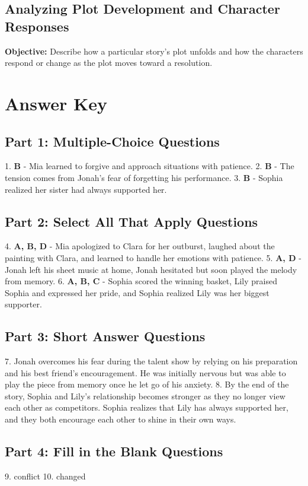 \documentclass[12pt]{article}
\begin{document}
\subsection*{Analyzing Plot Development and Character Responses}
\onehalfspacing

\begin{tcolorbox}[colframe=black!40, colback=gray!0, title=Learning Objective]
\textbf{Objective:} Describe how a particular story’s plot unfolds and how the characters respond or change as the plot moves toward a resolution.
\end{tcolorbox}



\section*{Answer Key}

\subsection*{Part 1: Multiple-Choice Questions}
1. \textbf{B} - Mia learned to forgive and approach situations with patience.  
2. \textbf{B} - The tension comes from Jonah’s fear of forgetting his performance.  
3. \textbf{B} - Sophia realized her sister had always supported her.  

\subsection*{Part 2: Select All That Apply Questions}
4. \textbf{A, B, D} - Mia apologized to Clara for her outburst, laughed about the painting with Clara, and learned to handle her emotions with patience.  
5. \textbf{A, D} - Jonah left his sheet music at home, Jonah hesitated but soon played the melody from memory.  
6. \textbf{A, B, C} - Sophia scored the winning basket, Lily praised Sophia and expressed her pride, and Sophia realized Lily was her biggest supporter.  

\subsection*{Part 3: Short Answer Questions}
7. Jonah overcomes his fear during the talent show by relying on his preparation and his best friend’s encouragement. He was initially nervous but was able to play the piece from memory once he let go of his anxiety.  
8. By the end of the story, Sophia and Lily’s relationship becomes stronger as they no longer view each other as competitors. Sophia realizes that Lily has always supported her, and they both encourage each other to shine in their own ways.

\subsection*{Part 4: Fill in the Blank Questions}
9. conflict  
10. changed  
\end{document}

